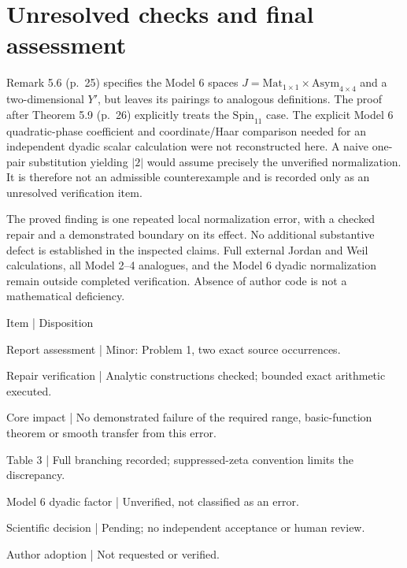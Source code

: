 \documentclass[10pt]{article}
\begin{document}
\section*{Unresolved checks and final assessment}
Remark 5.6 (p. 25) specifies the Model 6 spaces \(J=\mathrm{Mat}_{1\times1}\times\mathrm{Asym}_{4\times4}\) and a two-dimensional \(Y'\), but leaves its pairings to analogous definitions. The proof after Theorem 5.9 (p. 26) explicitly treats the \(\mathrm{Spin}_{11}\) case. The explicit Model 6 quadratic-phase coefficient and coordinate/Haar comparison needed for an independent dyadic scalar calculation were not reconstructed here. A naive one-pair substitution yielding \(|2|\) would assume precisely the unverified normalization. It is therefore not an admissible counterexample and is recorded only as an unresolved verification item.\par
The proved finding is one repeated local normalization error, with a checked repair and a demonstrated boundary on its effect. No additional substantive defect is established in the inspected claims. Full external Jordan and Weil calculations, all Model 2–4 analogues, and the Model 6 dyadic normalization remain outside completed verification. Absence of author code is not a mathematical deficiency.\par
Item | Disposition\par
Report assessment | Minor: Problem 1, two exact source occurrences.\par
Repair verification | Analytic constructions checked; bounded exact arithmetic executed.\par
Core impact | No demonstrated failure of the required range, basic-function theorem or smooth transfer from this error.\par
Table 3 | Full branching recorded; suppressed-zeta convention limits the discrepancy.\par
Model 6 dyadic factor | Unverified, not classified as an error.\par
Scientific decision | Pending; no independent acceptance or human review.\par
Author adoption | Not requested or verified.\par
\end{document}

